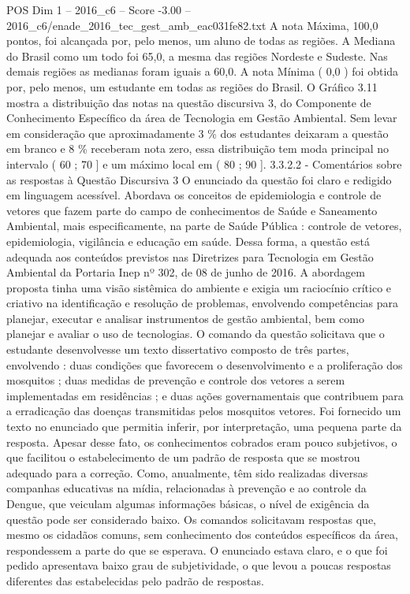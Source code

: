 \begin{textsample}{POS Dim 1 – 2016\_c6 – Score -3.00 – 2016\_c6/enade\_2016\_tec\_gest\_amb\_eac031fe82.txt}
A nota Máxima, 100,0 pontos, foi alcançada por, pelo menos, um aluno de todas as regiões.
A Mediana do Brasil como um todo foi 65,0, a mesma das regiões Nordeste e Sudeste.
Nas demais regiões as medianas foram iguais a 60,0.
A nota Mínima ( 0,0 ) foi obtida por, pelo menos, um estudante em todas as regiões do Brasil.
O Gráfico 3.11 mostra a distribuição das notas na questão discursiva 3, do Componente de Conhecimento Específico da área de Tecnologia em Gestão Ambiental.
Sem levar em consideração que aproximadamente 3 \% dos estudantes deixaram a questão em branco e 8 \% receberam nota zero, essa distribuição tem moda principal no intervalo ( 60 ; 70 ] e um máximo local em ( 80 ; 90 ]. 3.3.2.2 - Comentários sobre as respostas à Questão Discursiva 3 O enunciado da questão foi claro e redigido em linguagem acessível.
Abordava os conceitos de epidemiologia e controle de vetores que fazem parte do campo de conhecimentos de Saúde e Saneamento Ambiental, mais especificamente, na parte de Saúde Pública : controle de vetores, epidemiologia, vigilância e educação em saúde.
Dessa forma, a questão está adequada aos conteúdos previstos nas Diretrizes para Tecnologia em Gestão Ambiental da Portaria Inep nº 302, de 08 de junho de 2016.
A abordagem proposta tinha uma visão sistêmica do ambiente e exigia um raciocínio crítico e criativo na identificação e resolução de problemas, envolvendo competências para planejar, executar e analisar instrumentos de gestão ambiental, bem como planejar e avaliar o uso de tecnologias.
O comando da questão solicitava que o estudante desenvolvesse um texto dissertativo composto de três partes, envolvendo : duas condições que favorecem o desenvolvimento e a proliferação dos mosquitos ; duas medidas de prevenção e controle dos vetores a serem implementadas em residências ; e duas ações governamentais que contribuem para a erradicação das doenças transmitidas pelos mosquitos vetores.
Foi fornecido um texto no enunciado que permitia inferir, por interpretação, uma pequena parte da resposta.
Apesar desse fato, os conhecimentos cobrados eram pouco subjetivos, o que facilitou o estabelecimento de um padrão de resposta que se mostrou adequado para a correção.
Como, anualmente, têm sido realizadas diversas companhas educativas na mídia, relacionadas à prevenção e ao controle da Dengue, que veiculam algumas informações básicas, o nível de exigência da questão pode ser considerado baixo.
Os comandos solicitavam respostas que, mesmo os cidadãos comuns, sem conhecimento dos conteúdos específicos da área, respondessem a parte do que se esperava.
O enunciado estava claro, e o que foi pedido apresentava baixo grau de subjetividade, o que levou a poucas respostas diferentes das estabelecidas pelo padrão de respostas.

\end{textsample}
